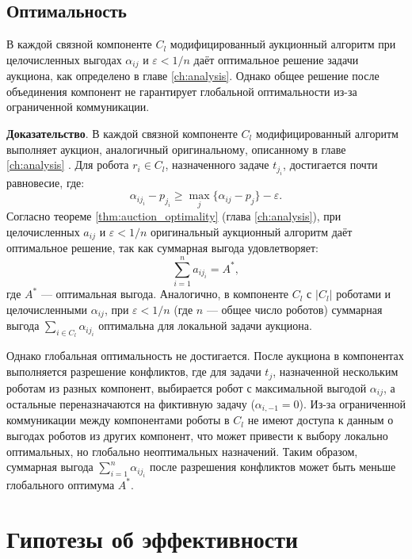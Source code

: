 \subsection{Оптимальность}

\begin{theorem}
\label{thm:mod_auction_optimality}
В каждой связной компоненте \( C_l \) модифицированный аукционный алгоритм при целочисленных выгодах \( \alpha_{ij} \) и \( \varepsilon < 1/n \) даёт оптимальное решение задачи аукциона, как определено в главе \ref{ch:analysis}. Однако общее решение после объединения компонент не гарантирует глобальной оптимальности из-за ограниченной коммуникации.
\end{theorem}

\textbf{Доказательство}. 
В каждой связной компоненте \( C_l \) модифицированный алгоритм выполняет аукцион, аналогичный оригинальному, описанному в главе \ref{ch:analysis} \cite{bertsekas1990}. Для робота \( r_i \in C_l \), назначенного задаче \( t_{j_i} \), достигается почти равновесие, где:
\[
\alpha_{i j_i} - p_{j_i} \geq \max_j \{\alpha_{ij} - p_j\} - \varepsilon.
\]
Согласно теореме \ref{thm:auction_optimality} (глава \ref{ch:analysis}), при целочисленных \( a_{ij} \) и \( \varepsilon < 1/n \) оригинальный аукционный алгоритм даёт оптимальное решение, так как суммарная выгода удовлетворяет:
\[
\sum_{i=1}^n a_{i j_i} = A^*,
\]
где \( A^* \) — оптимальная выгода. Аналогично, в компоненте \( C_l \) с \( |C_l| \) роботами и целочисленными \( \alpha_{ij} \), при \( \varepsilon < 1/n \) (где \( n \) — общее число роботов) суммарная выгода \( \sum_{i \in C_l} \alpha_{i j_i} \) оптимальна для локальной задачи аукциона.

Однако глобальная оптимальность не достигается. После аукциона в компонентах выполняется разрешение конфликтов, где для задачи \( t_j \), назначенной нескольким роботам из разных компонент, выбирается робот с максимальной выгодой \( \alpha_{ij} \), а остальные переназначаются на фиктивную задачу (\( \alpha_{i,-1} = 0 \)). Из-за ограниченной коммуникации между компонентами роботы в \( C_l \) не имеют доступа к данным о выгодах роботов из других компонент, что может привести к выбору локально оптимальных, но глобально неоптимальных назначений. Таким образом, суммарная выгода \( \sum_{i=1}^n \alpha_{i j_i} \) после разрешения конфликтов может быть меньше глобального оптимума \( A^* \).

\section{Гипотезы об эффективности}

